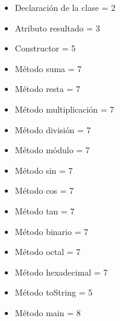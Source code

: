 \documentclass[10pt]{article}
\begin{document}
\begin{itemize}
\item Declaraci\'on de la clase = 2
\item Atributo resultado = 3
\item Constructor = 5
\item M\'etodo suma = 7
\item M\'etodo resta = 7
\item M\'etodo multiplicaci\'on = 7
\item M\'etodo divisi\'on = 7
\item M\'etodo m\'odulo = 7
\item M\'etodo sin = 7
\item M\'etodo cos = 7
\item M\'etodo tan = 7
\item M\'etodo binario = 7
\item M\'etodo octal = 7
\item M\'etodo hexadecimal = 7
\item M\'etodo toString = 5
\item M\'etodo main = 8
\end{itemize}
\newpage

\end{document}
